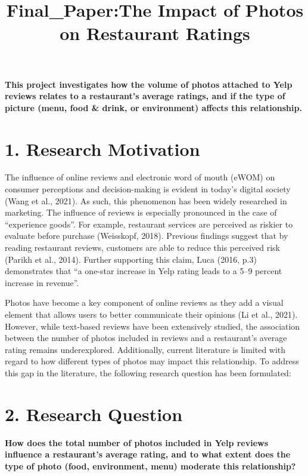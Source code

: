 \documentclass[
]{article}
\title{Final\_Paper:The Impact of Photos on Restaurant Ratings}
\author{}
\date{\vspace{-2.5em}}
\begin{document}
\maketitle

{
\setcounter{tocdepth}{2}
\tableofcontents
}
\textbf{This project investigates how the volume of photos attached to
Yelp reviews relates to a restaurant's average ratings, and if the type
of picture (menu, food \& drink, or environment) affects this
relationship.}

\section{1. Research Motivation}\label{research-motivation}

The influence of online reviews and electronic word of mouth (eWOM) on
consumer perceptions and decision-making is evident in today's digital
society (Wang et al., 2021). As such, this phenomenon has been widely
researched in marketing. The influence of reviews is especially
pronounced in the case of ``experience goods''. For example, restaurant
services are perceived as riskier to evaluate before purchase
(Weisskopf, 2018). Previous findings suggest that by reading restaurant
reviews, customers are able to reduce this perceived risk (Parikh et
al., 2014). Further supporting this claim, Luca (2016, p.3) demonstrates
that ``a one-star increase in Yelp rating leads to a 5--9 percent
increase in revenue''.

Photos have become a key component of online reviews as they add a
visual element that allows users to better communicate their opinions
(Li et al., 2021). However, while text-based reviews have been
extensively studied, the association between the number of photos
included in reviews and a restaurant's average rating remains
underexplored. Additionally, current literature is limited with regard
to how different types of photos may impact this relationship. To
address this gap in the literature, the following research question has
been formulated:

\section{2. Research Question}\label{research-question}

\textbf{How does the total number of photos included in Yelp reviews
influence a restaurant's average rating, and to what extent does the
type of photo (food, environment, menu) moderate this relationship?}
\end{document}
